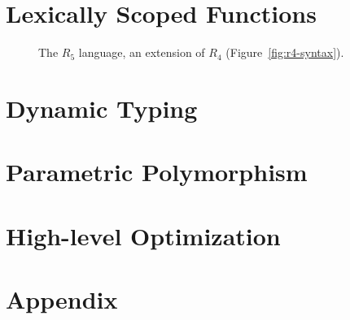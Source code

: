 \documentclass[11pt]{book}
\begin{document}
\chapter{Lexically Scoped Functions}
\label{ch:lambdas}

\begin{figure}[tbp]
\centering
{}
\caption{The $R_5$ language, an extension of $R_4$
  (Figure~\ref{fig:r4-syntax}).}
\label{fig:r5-syntax}
\end{figure}



\chapter{Dynamic Typing}
\label{ch:type-dynamic}


\chapter{Parametric Polymorphism}
\label{ch:parametric-polymorphism}

\chapter{High-level Optimization}
\label{ch:high-level-optimization}

\chapter{Appendix}
\end{document}
